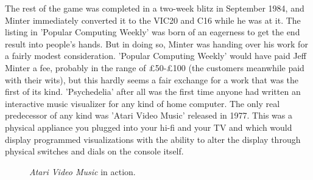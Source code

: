 The rest of the game was completed in a two-week blitz in September 1984, and Minter immediately converted it to the VIC20 and C16 while he was at it.
The listing in 'Popular Computing Weekly' was born of an eagerness to get the end result into people's hands. But in doing so, Minter
was handing over his work for a fairly modest consideration. 'Popular Computing Weekly' would have paid Jeff Minter a fee, probably in the range of £50-£100 (the customers meanwhile paid with their wits), but this hardly seems a fair exchange for a work that was the first of its kind.
'Psychedelia' after all was the first time anyone had written an interactive music visualizer for any kind of home computer. The only 
real predecessor of any kind was 'Atari Video Music' released in 1977. This was a physical appliance you plugged into your hi-fi and
your TV and which would display programmed visualizations with the ability to alter the display through physical switches and dials on the 
console itself.
\begin{figure}[H]
    \centering
    \begin{adjustbox}{width=12cm,center}
      \hspace{0.5cm}
    \end{adjustbox}
  \caption{\textit{Atari Video Music} in action.}
\end{figure}

